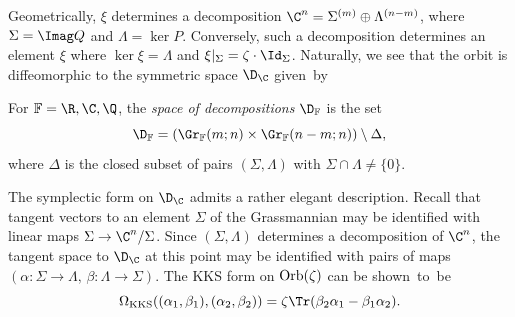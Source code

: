 Geometrically, $\xi$ determines a decomposition $\C^n=\Sigma^{(m)}\oplus \Lambda^{(n-m)}$, where ${\Sigma=\Imag Q}$ and $\Lambda=\ker P$. Conversely, such a decomposition determines an element $\xi$ where $\ker\xi=\Lambda$ and ${\xi|_\Sigma=\zeta\cdot\Id_\Sigma}$. Naturally, we see that the orbit is diffeomorphic to the symmetric space $\D_\C$ given~by
\begin{Definition}
	For $\mathbb{F}=\R,\C,\Q$, the \emph{space of decompositions} $\D_\mathbb{F}$ is the set
	\begin{equation}
		\label{elegant_A+B}
		\D_\mathbb{F}=(\Gr_\mathbb{F}(m;n)\times \Gr_\mathbb{F}(n-m;n))\setminus\Delta,
	\end{equation}
	where $\Delta$ is the closed subset of pairs $(\Sigma,\Lambda)$ with $\Sigma\cap\Lambda\ne\{0\}$.
\end{Definition}
\begin{Remark}\label{elegant_rmk}
	The symplectic form on $\D_{\C}$ admits a rather elegant description. Recall that tangent vectors to an element $\Sigma$ of the Grassmannian may be identified with linear maps ${\Sigma\rightarrow\C^n/\Sigma}$. Since $(\Sigma,\Lambda)$ determines a decomposition of $\C^n$, the tangent space to $\D_{\C}$ at this point may be identified with pairs of maps $(\alpha\colon\Sigma\rightarrow\Lambda,\,\beta\colon \Lambda\rightarrow\Sigma)$. The KKS form on ${\rm Orb}(\zeta)$ can be shown~to~be
	\[
		\Omega_{\rm KKS}((\alpha_1,\beta_1),(\alpha_2,\beta_2))=\zeta\Tr(\beta_2\alpha_1-\beta_1\alpha_2).
	\]
\end{Remark}
